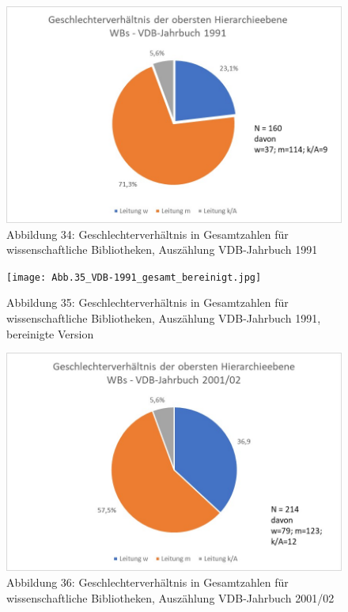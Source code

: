 \documentclass[a4paper,
fontsize=11pt,
oneside,
numbers=noperiodatend,
parskip=half-,
bibliography=totoc,
final
]{scrartcl}
\begin{document}
\begin{figure}
\centering
\includegraphics{img/Abb.34_VDB-1991_gesamt.jpg}
\caption{Abbildung 34: Geschlechterverhältnis in Gesamtzahlen für
wissenschaftliche Bibliotheken, Auszählung VDB-Jahrbuch 1991}
\end{figure}

\begin{figure}
\centering
\texttt{[image: Abb.35\_VDB-1991\_gesamt\_bereinigt.jpg]}
\caption{Abbildung 35: Geschlechterverhältnis in Gesamtzahlen für
wissenschaftliche Bibliotheken, Auszählung VDB-Jahrbuch 1991, bereinigte
Version}
\end{figure}

\begin{figure}
\centering
\includegraphics{img/Abb.36_VDB-2001_gesamt.jpg}
\caption{Abbildung 36: Geschlechterverhältnis in Gesamtzahlen für
wissenschaftliche Bibliotheken, Auszählung VDB-Jahrbuch 2001/02}
\end{figure}
\end{document}
